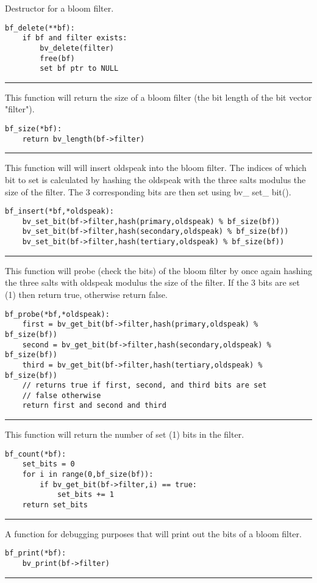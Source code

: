 \documentclass[
	12pt, %
]{fphw}
\begin{document}
Destructor for a bloom filter.
\begin{lstlisting}[mathescape=true]
bf_delete(**bf):
	if bf and filter exists:
		bv_delete(filter)
		free(bf)
		set bf ptr to NULL
\end{lstlisting}
\noindent\rule{6.3in}{0.4pt}

This function will return the size of a bloom filter (the bit length of the bit vector "filter").
\begin{lstlisting}[mathescape=true]
bf_size(*bf):
	return bv_length(bf->filter)
\end{lstlisting}
\noindent\rule{6.3in}{0.4pt}

This function will will insert oldspeak into the bloom filter. The indices of which bit to set is calculated by hashing the oldspeak with the three salts modulus the size of the filter. The 3 corresponding bits are then set using bv\_ set\_ bit().
\begin{lstlisting}[mathescape=true]
bf_insert(*bf,*oldspeak):
	bv_set_bit(bf->filter,hash(primary,oldspeak) % bf_size(bf))
	bv_set_bit(bf->filter,hash(secondary,oldspeak) % bf_size(bf))
	bv_set_bit(bf->filter,hash(tertiary,oldspeak) % bf_size(bf))
\end{lstlisting}
\noindent\rule{6.3in}{0.4pt}

This function will probe (check the bits) of the bloom filter by once again hashing the three salts with oldspeak modulus the size of the filter. If the 3 bits are set (1) then return true, otherwise return false.
\begin{lstlisting}[mathescape=true]
bf_probe(*bf,*oldspeak):
	first = bv_get_bit(bf->filter,hash(primary,oldspeak) % bf_size(bf))
	second = bv_get_bit(bf->filter,hash(secondary,oldspeak) % bf_size(bf))
	third = bv_get_bit(bf->filter,hash(tertiary,oldspeak) % bf_size(bf))
	// returns true if first, second, and third bits are set
	// false otherwise
	return first and second and third
\end{lstlisting}
\noindent\rule{6.3in}{0.4pt}

This function will return the number of set (1) bits in the filter.
\begin{lstlisting}[mathescape=true]
bf_count(*bf):
	set_bits = 0
	for i in range(0,bf_size(bf)):
		if bv_get_bit(bf->filter,i) == true:
			set_bits += 1
	return set_bits
\end{lstlisting}
\noindent\rule{6.3in}{0.4pt}

A function for debugging purposes that will print out the bits of a bloom filter.
\begin{lstlisting}[mathescape=true]
bf_print(*bf):
	bv_print(bf->filter)
\end{lstlisting}
\noindent\rule{6.3in}{0.4pt}
\end{document}
